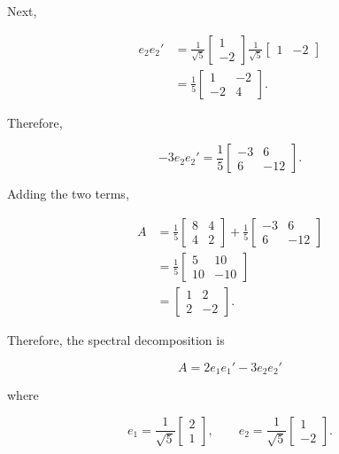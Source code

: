 \documentclass[12pt]{article}
\begin{document}
	Next,
	
	\[
	\begin{aligned}
		e_2e_2'
		&=
		\frac{1}{\sqrt{5}}
		\begin{bmatrix}
			1\\
			-2
		\end{bmatrix}
		\frac{1}{\sqrt{5}}
		\begin{bmatrix}
			1&-2
		\end{bmatrix}\\
		&=
		\frac{1}{5}
		\begin{bmatrix}
			1&-2\\
			-2&4
		\end{bmatrix}.
	\end{aligned}
	\]
	
	Therefore,
	
	\[
	-3e_2e_2'
	=
	\frac{1}{5}
	\begin{bmatrix}
		-3&6\\
		6&-12
	\end{bmatrix}.
	\]
	
	Adding the two terms,
	
	\[
	\begin{aligned}
		A
		&=
		\frac{1}{5}
		\begin{bmatrix}
			8&4\\
			4&2
		\end{bmatrix}
		+
		\frac{1}{5}
		\begin{bmatrix}
			-3&6\\
			6&-12
		\end{bmatrix}\\
		&=
		\frac{1}{5}
		\begin{bmatrix}
			5&10\\
			10&-10
		\end{bmatrix}\\
		&=
		\begin{bmatrix}
			1&2\\
			2&-2
		\end{bmatrix}.
	\end{aligned}
	\]
	
	Therefore, the spectral decomposition is
	
	\[
	\boxed{
		A=2e_1e_1'-3e_2e_2'
	}
	\]
	
	where
	
	\[
	\boxed{
		e_1=
		\frac{1}{\sqrt{5}}
		\begin{bmatrix}
			2\\
			1
		\end{bmatrix},
		\qquad
		e_2=
		\frac{1}{\sqrt{5}}
		\begin{bmatrix}
			1\\
			-2
		\end{bmatrix}
	}.
	\]
	
\end{document}
